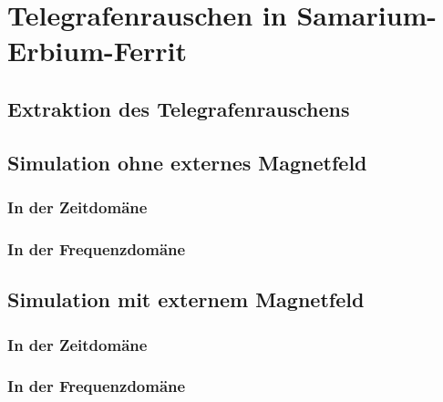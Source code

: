 \documentclass[main.tex]{subfiles}
\begin{document}
\section{Telegrafenrauschen in Samarium-Erbium-Ferrit}

\subsection{Extraktion des Telegrafenrauschens}

\subsection{Simulation ohne externes Magnetfeld}
\subsubsection{In der Zeitdomäne}
\subsubsection{In der Frequenzdomäne}

\subsection{Simulation mit externem Magnetfeld}
\subsubsection{In der Zeitdomäne}
\subsubsection{In der Frequenzdomäne}
\end{document}
